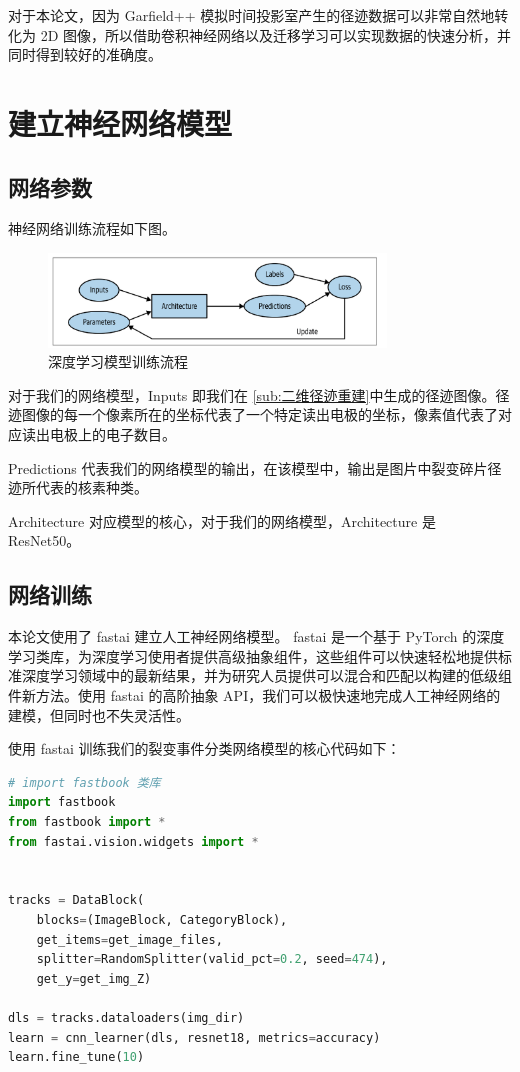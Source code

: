 \documentclass[AutoFakeBold]{LZUThesis}
\begin{document}
对于本论文，因为 Garfield++ 模拟时间投影室产生的径迹数据可以非常自然地转化为 2D 图像，所以借助卷积神经网络以及迁移学习可以实现数据的快速分析，并同时得到较好的准确度。




\section{建立神经网络模型}
\subsection{网络参数}
神经网络训练流程如下图。

\begin{figure}[H]
    \centering
    \includegraphics[width=0.8\textwidth]{figures/deep-learning.png}
    \caption{深度学习模型训练流程}
    \label{fig_deep-learning}
\end{figure}

对于我们的网络模型，Inputs 即我们在 \ref{sub:二维径迹重建}中生成的径迹图像。径迹图像的每一个像素所在的坐标代表了一个特定读出电极的坐标，像素值代表了对应读出电极上的电子数目。

Predictions 代表我们的网络模型的输出，在该模型中，输出是图片中裂变碎片径迹所代表的核素种类。

Architecture 对应模型的核心，对于我们的网络模型，Architecture 是 ResNet50。


\subsection{网络训练}
本论文使用了 fastai\cite{howard2020fastai} 建立人工神经网络模型。
fastai 是一个基于 PyTorch 的深度学习类库，为深度学习使用者提供高级抽象组件，这些组件可以快速轻松地提供标准深度学习领域中的最新结果，并为研究人员提供可以混合和匹配以构建的低级组件新方法。使用 fastai 的高阶抽象 API，我们可以极快速地完成人工神经网络的建模，但同时也不失灵活性。

使用 fastai 训练我们的裂变事件分类网络模型的核心代码如下：

\begin{lstlisting}[language = python]
# import fastbook 类库
import fastbook
from fastbook import *
from fastai.vision.widgets import *


tracks = DataBlock(
    blocks=(ImageBlock, CategoryBlock),
    get_items=get_image_files, 
    splitter=RandomSplitter(valid_pct=0.2, seed=474),
    get_y=get_img_Z)

dls = tracks.dataloaders(img_dir)
learn = cnn_learner(dls, resnet18, metrics=accuracy)
learn.fine_tune(10)
\end{lstlisting}
\end{document}
